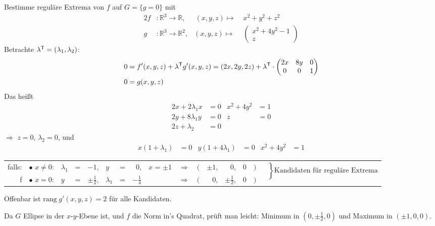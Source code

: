 \begin{example}
	Bestimme reguläre Extrema von $f$ auf $G=\{ g=0\}$ mit
	\begin{alignat*}{2}
		f&:\mathbb{R}^3\to\mathbb{R},&\, (x,y,z) \mapsto\;&x^2 + y^2 + z^2 \\
		g&:\mathbb{R}^3\to\mathbb{R}^2,& (x,y,z) \mapsto& \begin{pmatrix}
	x^2 + 4y^2 - 1 \\ z
	\end{pmatrix}
	\end{alignat*}
	Betrachte $\lambda^\mathsf{T} = (\lambda_1,\lambda_2)$: \begin{align}
		0 &= f'(x,y,z) + \lambda^\mathsf{T}g'(x,y,z) = (2x, 2y, 2z) + \lambda^\mathsf{T}\cdot\begin{pmatrix}
			2x & 8y & 0 \\ 0 & 0 & 1
		\end{pmatrix} \\
		\notag 0 &= g(x,y,z)
	\end{align}
	Das heißt \begin{align*}
		2x + 2\lambda_1 x &= 0 & x^2 + 4y^2 &= 1 \\
		2y+8\lambda_1 y &= 0 & z &= 0 \\
		2z + \lambda_2 &= 0 & &
	\end{align*}
	$\Rightarrow$ $z=0$, $\lambda_2 = 0$, und \begin{align*}
		x(1 + \lambda_1) &= 0 & y(1 + 4\lambda_1) &= 0 & x^2 + 4y^2 &= 1
	\end{align*}
	\begin{tabularx}{\linewidth}{@{}r@{\ }l@{\ }l@{\ }c@{\ }r@{\ }l@{\ }c@{\ }r@{\ }l@{\ \ }c@{\ \ }r@{$\,$}r@{$\,$}r@{$\,$}r@{$\,$}lX}
	falls:& $\bullet$ $x\neq 0$:& $\lambda_1$ & = & $-1$, &$y$ & = & $0$, &$x$ = $\pm 1$ &$\Rightarrow$& $($ & $\pm1$, & 0, &0 & $)$ & \multirow{2}{*}{$\left.\phantom{\dfrac{1}{1}}\right\} \text{Kandidaten für reguläre Extrema}$} \\
f		  &	$\bullet$ $x = 0$:  & $y$ & = &$\pm\frac{1}{2}$, &$\lambda_1$ & = & $-\frac{1}{4}$& & $\Rightarrow$& $($ & 0,&$\pm\frac{1}{2}$, &0 &$)$	\end{tabularx}

	Offenbar ist $\mathrm{rang}\;g'(x,y,z)=2$ für alle Kandidaten.
	
	Da $G$ Ellipse in der $x$-$y$-Ebene ist, und $f$ die Norm in's Quadrat, prüft man leicht: Minimum in $(0,\pm\frac{1}{2},0)$ und Maximum in $(\pm 1,0,0)$.
\end{example}

